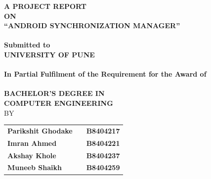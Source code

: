 
\newpage


\begin{center}
\thispagestyle{empty}


\Large{\textbf{A PROJECT REPORT\\ON}}\\[0.7cm]
\Large{\textsc {\textbf{``ANDROID SYNCHRONIZATION MANAGER''}}}\\[0.5cm]
\Large{\textbf{\\Submitted to}}
\LARGE{\textbf{\\UNIVERSITY OF PUNE\\}}
\large{\textbf{\\In Partial Fulfilment of the Requirement for the Award of\\}}
\LARGE{\textbf{\\BACHELOR'S DEGREE IN\\COMPUTER ENGINEERING}}
\vspace{0.5cm}
\LARGE{\\BY}\\[0.5cm]
\begin{table}[h]
\centering
\Large{
\begin{tabular}{>{\bfseries}lc>{\bfseries}r}
Parikshit Ghodake & & B8404217\\Imran Ahmed & & B8404221\\Akshay Khole & & B8404237\\Muneeb Shaikh & & B8404259\\
\end{tabular}}
\end{table}




\end{center}
